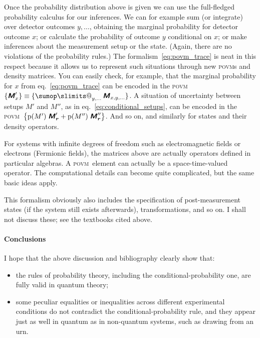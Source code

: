 \documentclass[\ifafour a4paper,12pt,\else a5paper,10pt,\fi%
onecolumn,oneside,article,%
british%
]{memoir}
\makeatletter
\theoremstyle{remark}
\theoremstyle{innote}
\def\sum{\DOTSI\sumop\slimits@}
\newcommand*{\mathte}[1]{\textbf{\textit{\textsf{#1}}}}
\DeclarePairedDelimiter\set{\{}{\}}
\newcommand*{\pf}{\mathrm{p}}%
\renewcommand*{\|}[1][]{\nonscript\,#1\vert\nonscript\;\mathopen{}}
\newcommand*{\eqn}{eq.}%
\newcommand*{\tsum}{\mathop{\textstyle\sum}\nolimits}
\newcommand*{\yM}{\mathte{M}}
\newcommand*{\povm}{\textsc{povm}}
\newcommand*{\ybr}{\bm{r}}
\makeatother
\begin{document}
Once the probability distribution above is given we can use the
full-fledged probability calculus for our inferences. We can for example
sum (or integrate) over detector outcomes $y,\dotsc{}$, obtaining the
marginal probability for detector outcome $x$; or calculate the probability
of outcome $y$ conditional on $x$; or make inferences about the measurement
setup or the state. (Again, there are no violations of the probability
rules.) The formalism~\eqref{eq:povm_trace} is neat in this respect because
it allows us to represent such situations through new \povm s and density
matrices. You can easily check, for example, that the marginal probability
for $x$ from \eqn~\eqref{eq:povm_trace} can be encoded in the \povm\
$\set{\yM'_{x}} \equiv \set{\tsum_{y,\dotsc}\yM_{x,y,\dotsc}}$. A situation
of uncertainty between setups $M'$ and $M''$, as in
\eqn~\eqref{eq:conditional_setups}, can be encoded in the \povm\
$\set[\big]{\pf(M')\;\yM'_{\ybr} + \pf(M'')\;\yM''_{\ybr}}$. And so on, and
similarly for states and their density operators.

\medskip

For systems with infinite degrees of freedom such as electromagnetic fields
or electrons (Fermionic fields), the matrices above are actually operators
defined in particular algebras. A \povm\ element can actually be a
space-time-valued operator. The computational details can become quite
complicated, but the same basic ideas apply.

This formalism obviously also includes the specification of
post-measurement states (if the system still exists afterwards),
transformations, and so on. I shall not discuss these; see the textbooks
cited above.

\bigskip

\paragraph{Conclusions}

I hope that the above discussion and bibliography clearly show that:
\begin{itemize}
\item the rules of probability theory, including the
  conditional-probability one, are fully valid in quantum theory;
\item some peculiar equalities or inequalities across different
  experimental conditions do not contradict the conditional-probability
  rule, and they appear just as well in quantum as in non-quantum systems,
  such as drawing from an urn.
\end{itemize}
\end{document}
